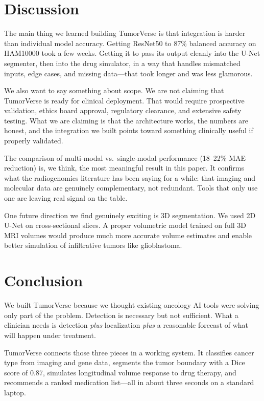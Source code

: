 \documentclass[conference]{IEEEtran}
\begin{document}
\section{Discussion}

The main thing we learned building TumorVerse is that integration is harder than individual model accuracy. Getting ResNet50 to 87\% balanced accuracy on HAM10000 took a few weeks. Getting it to pass its output cleanly into the U-Net segmenter, then into the drug simulator, in a way that handles mismatched inputs, edge cases, and missing data—that took longer and was less glamorous.

We also want to say something about scope. We are not claiming that TumorVerse is ready for clinical deployment. That would require prospective validation, ethics board approval, regulatory clearance, and extensive safety testing. What we are claiming is that the architecture works, the numbers are honest, and the integration we built points toward something clinically useful if properly validated.

The comparison of multi-modal vs.\ single-modal performance (18–22\% MAE reduction) is, we think, the most meaningful result in this paper. It confirms what the radiogenomics literature has been saying for a while: that imaging and molecular data are genuinely complementary, not redundant. Tools that only use one are leaving real signal on the table.

One future direction we find genuinely exciting is 3D segmentation. We used 2D U-Net on cross-sectional slices. A proper volumetric model trained on full 3D MRI volumes would produce much more accurate volume estimates and enable better simulation of infiltrative tumors like glioblastoma.

\section{Conclusion}

We built TumorVerse because we thought existing oncology AI tools were solving only part of the problem. Detection is necessary but not sufficient. What a clinician needs is detection \textit{plus} localization \textit{plus} a reasonable forecast of what will happen under treatment.

TumorVerse connects those three pieces in a working system. It classifies cancer type from imaging and gene data, segments the tumor boundary with a Dice score of 0.87, simulates longitudinal volume response to drug therapy, and recommends a ranked medication list—all in about three seconds on a standard laptop.
\end{document}
